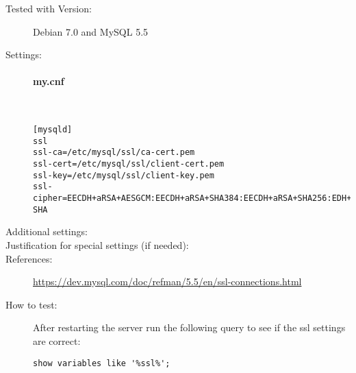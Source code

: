 \begin{description}
\item[Tested with Version:] Debian 7.0 and MySQL 5.5

\item[Settings:] \mbox{}

\paragraph*{my.cnf}\mbox{}\\

\begin{lstlisting}[breaklines]
[mysqld]
ssl
ssl-ca=/etc/mysql/ssl/ca-cert.pem
ssl-cert=/etc/mysql/ssl/client-cert.pem
ssl-key=/etc/mysql/ssl/client-key.pem
ssl-cipher=EECDH+aRSA+AESGCM:EECDH+aRSA+SHA384:EECDH+aRSA+SHA256:EDH+CAMELLIA256:EECDH:EDH+aRSA:+SSLv3:!aNULL:!eNULL:!LOW:!3DES:!MD5:!EXP:!PSK:!SRP:!DSS:!RC4:!SEED:!AES128:!CAMELLIA128:!ECDSA:AES256-SHA
\end{lstlisting}

\item[Additional settings:]


\item[Justification for special settings (if needed):]


\item[References:]
{\small \url{https://dev.mysql.com/doc/refman/5.5/en/ssl-connections.html}}


\item[How to test:]

After restarting the server run the following query to see if the ssl settings are correct:
\begin{lstlisting}[breaklines]
show variables like '%ssl%';
\end{lstlisting}


\end{description}


